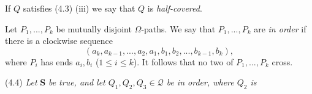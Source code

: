 If $Q$ satisfies (4.3) (iii) we say that $Q$ is \textit{half-covered}.

Let $P_1, ..., P_k$ be mutually disjoint $\Omega$-paths. We say that $P_1, ..., P_k$ are \textit{in order} if there is a clockwise sequence
\begin{equation*}
(a_k, a_{k-1}, ..., a_2, a_1, b_1, b_2, ..., b_{k-1}, b_k),
\end{equation*}
where $P_i$ has ends $a_i, b_i$ ($1 \le i \le k$). It follows that no two of $P_1, ..., P_k$ cross.

\stmt
(4.4) \textit{Let} \textbf{S} \textit{be true, and let $Q_1, Q_2, Q_3 \in \mathscr{Q}$ be in order, where $Q_2$ is}
